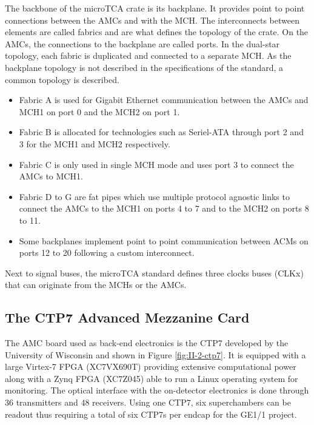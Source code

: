       The backbone of the microTCA crate is its backplane. It provides point to point connections between the AMCs and with the MCH. The interconnects between elements are called fabrics and are what defines the topology of the crate. On the AMCs, the connections to the backplane are called ports. In the dual-star topology, each fabric is duplicated and connected to a separate MCH. As the backplane topology is not described in the specifications of the standard, a common topology is described.
      \begin{itemize}
        \item Fabric A is used for Gigabit Ethernet communication between the AMCs and MCH1 on port 0 and the MCH2 on port 1.
        \item Fabric B is allocated for technologies such as Seriel-ATA through port 2 and 3 for the MCH1 and MCH2 respectively.
        \item Fabric C is only used in single MCH mode and uses port 3 to connect the AMCs to MCH1.
        \item Fabric D to G are fat pipes which use multiple protocol agnostic links to connect the AMCs to the MCH1 on ports 4 to 7 and to the MCH2 on ports 8 to 11.
        \item Some backplanes implement point to point communication between ACMs on ports 12 to 20 following a custom interconnect.
      \end{itemize}
      Next to signal buses, the microTCA standard defines three clocks buses (CLKx) that can originate from the MCHs or the AMCs.

    \subsection{The CTP7 Advanced Mezzanine Card}
    \label{sec:II-2-ctp7}

      The AMC board used as back-end electronics is the CTP7 \cite{CTP7} developed by the University of Wisconsin and shown in Figure \ref{fig:II-2-ctp7}. It is equipped with a large Virtex-7 FPGA (XC7VX690T) providing extensive computational power along with a Zynq FPGA (XC7Z045) able to run a Linux operating system for monitoring. The optical interface with the on-detector electronics is done through 36 transmitters and 48 receivers. Using one CTP7, six superchambers can be readout thus requiring a total of six CTP7s per endcap for the GE1/1 project. \\

